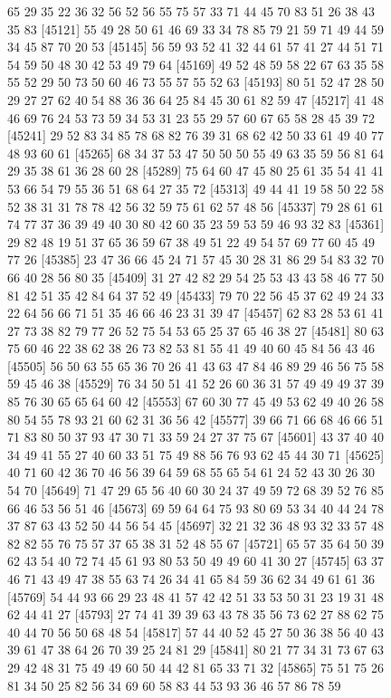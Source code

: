 \documentclass{article}
\begin{document}
\begin{figure}[H]
\begin{Schunk}
\begin{Soutput}
[45097] 65 29 35 22 36 32 56 52 56 55 75 57 33 71 44 45 70 83 51 26 38 43 35 83
[45121] 55 49 28 50 61 46 69 33 34 78 85 79 21 59 71 49 44 59 34 45 87 70 20 53
[45145] 56 59 93 52 41 32 44 61 57 41 27 44 51 71 54 59 50 48 30 42 53 49 79 64
[45169] 49 52 48 59 58 22 67 63 35 58 55 52 29 50 73 50 60 46 73 55 57 55 52 63
[45193] 80 51 52 47 28 50 29 27 27 62 40 54 88 36 36 64 25 84 45 30 61 82 59 47
[45217] 41 48 46 69 76 24 53 73 59 34 53 31 23 55 29 57 60 67 65 58 28 45 39 72
[45241] 29 52 83 34 85 78 68 82 76 39 31 68 62 42 50 33 61 49 40 77 48 93 60 61
[45265] 68 34 37 53 47 50 50 50 55 49 63 35 59 56 81 64 29 35 38 61 36 28 60 28
[45289] 75 64 60 47 45 80 25 61 35 54 41 41 53 66 54 79 55 36 51 68 64 27 35 72
[45313] 49 44 41 19 58 50 22 58 52 38 31 31 78 78 42 56 32 59 75 61 62 57 48 56
[45337] 79 28 61 61 74 77 37 36 39 49 40 30 80 42 60 35 23 59 53 59 46 93 32 83
[45361] 29 82 48 19 51 37 65 36 59 67 38 49 51 22 49 54 57 69 77 60 45 49 77 26
[45385] 23 47 36 66 45 24 71 57 45 30 28 31 86 29 54 83 32 70 66 40 28 56 80 35
[45409] 31 27 42 82 29 54 25 53 43 43 58 46 77 50 81 42 51 35 42 84 64 37 52 49
[45433] 79 70 22 56 45 37 62 49 24 33 22 64 56 66 71 51 35 46 66 46 23 31 39 47
[45457] 62 83 28 53 61 41 27 73 38 82 79 77 26 52 75 54 53 65 25 37 65 46 38 27
[45481] 80 63 75 60 46 22 38 62 38 26 73 82 53 81 55 41 49 40 60 45 84 56 43 46
[45505] 56 50 63 55 65 36 70 26 41 43 63 47 84 46 89 29 46 56 75 58 59 45 46 38
[45529] 76 34 50 51 41 52 26 60 36 31 57 49 49 49 37 39 85 76 30 65 65 64 60 42
[45553] 67 60 30 77 45 49 53 62 49 40 26 58 80 54 55 78 93 21 60 62 31 36 56 42
[45577] 39 66 71 66 68 46 66 51 71 83 80 50 37 93 47 30 71 33 59 24 27 37 75 67
[45601] 43 37 40 40 34 49 41 55 27 40 60 33 51 75 49 88 56 76 93 62 45 44 30 71
[45625] 40 71 60 42 36 70 46 56 39 64 59 68 55 65 54 61 24 52 43 30 26 30 54 70
[45649] 71 47 29 65 56 40 60 30 24 37 49 59 72 68 39 52 76 85 66 46 53 56 51 46
[45673] 69 59 64 64 75 93 80 69 53 34 40 44 24 78 37 87 63 43 52 50 44 56 54 45
[45697] 32 21 32 36 48 93 32 33 57 48 82 82 55 76 75 57 37 65 38 31 52 48 55 67
[45721] 65 57 35 64 50 39 62 43 54 40 72 74 45 61 93 80 53 50 49 49 60 41 30 27
[45745] 63 37 46 71 43 49 47 38 55 63 74 26 34 41 65 84 59 36 62 34 49 61 61 36
[45769] 54 44 93 66 29 23 48 41 57 42 42 51 33 53 50 31 23 19 31 48 62 44 41 27
[45793] 27 74 41 39 39 63 43 78 35 56 73 62 27 88 62 75 40 44 70 56 50 68 48 54
[45817] 57 44 40 52 45 27 50 36 38 56 40 43 39 61 47 38 64 26 70 39 25 24 81 29
[45841] 80 21 77 34 31 73 67 63 29 42 48 31 75 49 49 60 50 44 42 81 65 33 71 32
[45865] 75 51 75 26 81 34 50 25 82 56 34 69 60 58 83 44 53 93 36 46 57 86 78 59

\end{Soutput}
\end{Schunk}
\end{figure}
\end{document}
